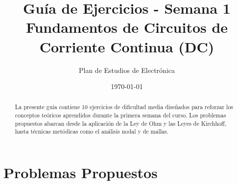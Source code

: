 \documentclass[12pt, a4paper]{article}
\begin{document}
\title{\textbf{Guía de Ejercicios - Semana 1} \\ \large Fundamentos de Circuitos de Corriente Continua (DC)}
\author{Plan de Estudios de Electrónica}
\date{\today}
\maketitle

\begin{abstract}
La presente guía contiene 10 ejercicios de dificultad media diseñados para reforzar los conceptos teóricos aprendidos durante la primera semana del curso. Los problemas propuestos abarcan desde la aplicación de la Ley de Ohm y las Leyes de Kirchhoff, hasta técnicas metódicas como el análisis nodal y de mallas.
\end{abstract}

\vspace{0.5cm}

\section*{Problemas Propuestos}
\end{document}

